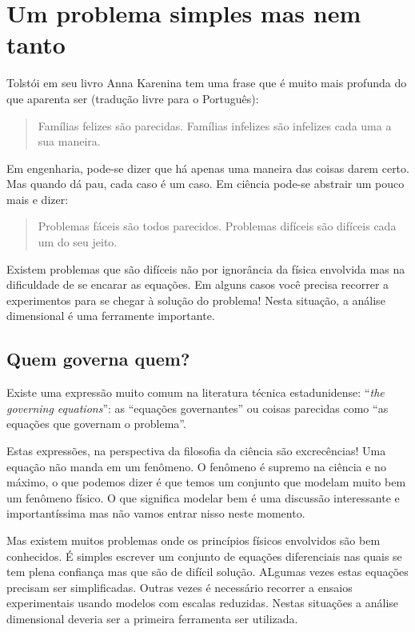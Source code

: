\chapter{Um problema simples mas nem tanto}
\label{sec:intro}

Tolstói em seu livro Anna Karenina tem uma frase que é muito mais profunda do que aparenta ser (tradução livre para o Português):
\begin{quote}
Famílias felizes são parecidas. Famílias infelizes são infelizes cada uma a sua maneira.
\end{quote}

Em engenharia, pode-se dizer que há apenas uma maneira das coisas darem certo. Mas quando dá pau, cada caso é um caso. Em ciência pode-se abstrair um pouco mais e dizer:
\begin{quote}
  Problemas fáceis são todos parecidos. Problemas difíceis são difíceis cada um do seu jeito.
\end{quote}

Existem problemas que são difíceis não por ignorância da física envolvida mas na dificuldade de se encarar as equações. Em alguns casos você precisa recorrer a experimentos para se chegar à solução do problema! Nesta situação, a análise dimensional é uma ferramente importante.

\section{Quem governa quem?}
Existe uma expressão muito comum na literatura técnica estadunidense: ``\emph{the governing equations}'': as ``equações governantes'' ou coisas parecidas como ``as equações que governam o problema''.

Estas expressões, na perspectiva da filosofia da ciência são excrecências! Uma equação não manda em um fenômeno. O fenômeno é supremo na ciência e no máximo, o que podemos dizer é que temos um conjunto que modelam muito bem um fenômeno físico. O que significa modelar bem é uma discussão interessante e importantíssima mas não vamos entrar nisso neste momento.

Mas existem muitos problemas onde os princípios físicos envolvidos são bem conhecidos. É simples escrever um conjunto de equações diferenciais nas quais se tem plena confiança mas que são de difícil solução. ALgumas vezes estas equações precisam ser simplificadas. Outras vezes é necessário recorrer a ensaios experimentais usando modelos com escalas reduzidas. Nestas situações a análise dimensional deveria ser a primeira ferramenta ser utilizada. 

